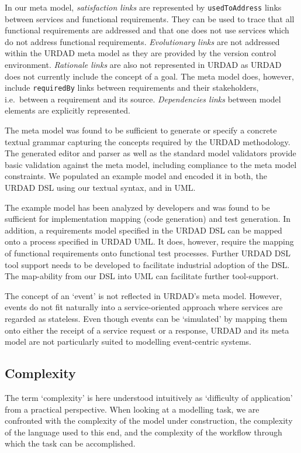 In our meta model, \emph{satisfaction links} are represented by \verb+usedToAddress+ links between services and functional requirements. They can be used to trace that all functional requirements are addressed and that one does not use services which do not address functional requirements. \emph{Evolutionary links} are not addressed within the URDAD meta model as they are provided by the version control environment. \emph{Rationale links} are also not represented in URDAD as URDAD does not currently include the concept of a goal. The meta model does, however, include  \verb+requiredBy+ links between requirements and their stakeholders, i.e.\ between a requirement and its source. \emph{Dependencies links} between model elements are explicitly represented. 

The meta model was found to be sufficient to generate or specify a concrete textual grammar capturing the concepts required by the URDAD methodology. The generated editor and parser as well as the standard model validators provide basic validation against the meta model, including compliance to the meta model constraints. We populated an example model and encoded it in both, the URDAD DSL using our textual syntax, and in UML.

The example model has been analyzed by developers and was found to be sufficient for implementation mapping (code generation) and test generation. In addition, a requirements model specified in the URDAD DSL can be mapped onto a process specified in URDAD UML. It does, however, require the mapping of functional requirements onto functional test processes. Further URDAD DSL tool support needs to be developed to facilitate industrial adoption of the DSL. The map-ability from our DSL into UML can facilitate further tool-support.

The concept of an `event' is not reflected in URDAD's meta model. However, events do not fit naturally into a service-oriented approach where services are regarded as stateless. Even though events can be `simulated' by mapping them onto either the receipt of a service request or a response, URDAD and its meta model are not particularly suited to modelling event-centric systems.

\subsection{Complexity}
The term `complexity' is here understood intuitively as `difficulty of application' from a practical perspective. When looking at a modelling task, we are confronted with the complexity of the model under construction, the complexity of the language used to this end, and the complexity of the workflow through which the task can be accomplished.

